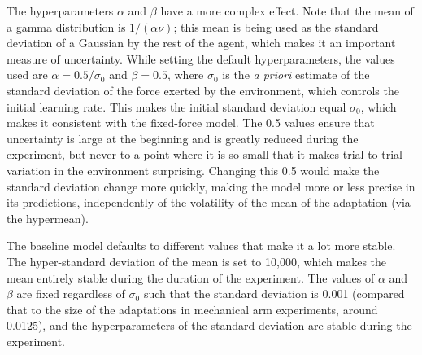 \documentclass[a4paper,doc,floatsintext,natbib]{apa6}%
\begin{document}
The hyperparameters $\alpha$ and $\beta$ have a more complex effect. Note that
the mean of a gamma distribution is $1 / (\alpha \nu)$; this mean is being used
as the standard deviation of a Gaussian by the rest of the agent, which makes it
an important measure of uncertainty. While setting the default hyperparameters,
the values used are $\alpha = 0.5 / \sigma_0$ and $\beta = 0.5$, where
$\sigma_0$ is the \textit{a priori} estimate of the standard deviation of the
force exerted by the environment, which controls the initial learning rate. This
makes the initial standard deviation equal $\sigma_0$, which makes it consistent
with the fixed-force model. The 0.5 values ensure that uncertainty is large at
the beginning and is greatly reduced during the experiment, but never to a point
where it is so small that it makes trial-to-trial variation in the environment
surprising. Changing this 0.5 would make the standard deviation change more
quickly, making the model more or less precise in its predictions, independently
of the volatility of the mean of the adaptation (via the hypermean).

The baseline model defaults to different values that make it a lot more
stable. The hyper-standard deviation of the mean is set to 10,000, which makes
the mean entirely stable during the duration of the experiment. The values of
$\alpha$ and $\beta$ are fixed regardless of $\sigma_0$ such that the standard
deviation is 0.001 (compared that to the size of the adaptations in mechanical
arm experiments, around 0.0125), and the hyperparameters of the standard
deviation are stable during the experiment.




\end{document}
